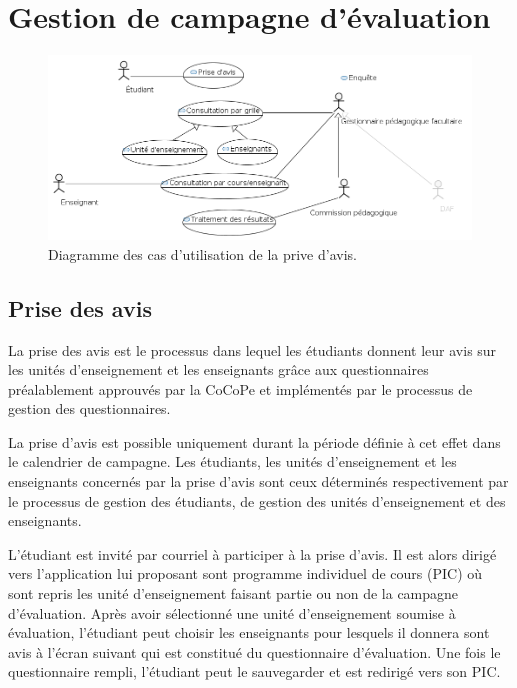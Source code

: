 \documentclass[a4paper,11pt]{report}
\begin{document}
\newpage
\section{Gestion de campagne d'évaluation}

\begin{figure}[ht]
\includegraphics[width=\linewidth]{workspace/evalens-usecases/prise_avis.png}
\caption{Diagramme des cas d'utilisation de la prive d'avis.}
\label{fig:usecase-avis}
\end{figure}

\subsection{Prise des avis}
La prise des avis est le processus dans lequel les étudiants donnent leur avis sur les unités d'enseignement et les enseignants grâce aux questionnaires préalablement approuvés par la CoCoPe et implémentés par le processus de gestion des questionnaires.

La prise d'avis est possible uniquement durant la période définie à cet effet dans le calendrier de campagne.
Les étudiants, les unités d'enseignement et les enseignants concernés par la prise d'avis sont ceux déterminés respectivement par le processus de gestion des étudiants, de gestion des unités d'enseignement et des enseignants.

L'étudiant est invité par courriel à participer à la prise d'avis.
Il est alors dirigé vers l'application lui proposant sont programme individuel de cours (PIC) où sont repris les unité d'enseignement faisant partie ou non de la campagne d'évaluation.
Après avoir sélectionné une unité d'enseignement soumise à évaluation, l'étudiant peut choisir les enseignants pour lesquels il donnera sont avis à l'écran suivant qui est constitué du questionnaire d'évaluation.
Une fois le questionnaire rempli, l'étudiant peut le sauvegarder et est redirigé vers son PIC.
\end{document}
